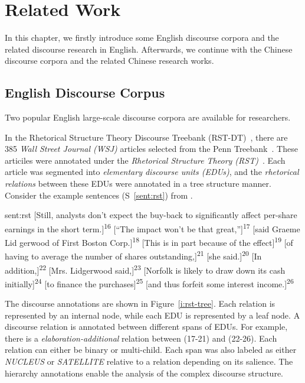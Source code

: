%
%
%
\chapter{Related Work}
\label{c:related}

In this chapter, we firstly introduce some English discourse corpora and the
related discourse research in English. Afterwards, we continue with the Chinese
discourse corpora and the related Chinese research works.

\section{English Discourse Corpus}

Two popular English large-scale discourse corpora are available for researchers.

In the Rhetorical Structure Theory Discourse Treebank (RST-DT)~\citep{Carlson01building},
there are 385 \textit{Wall Street Journal (WSJ)} articles selected from
the Penn Treebank~\citep{marcus1993building}. These articiles were annotated under
the \textit{Rhetorical Structure Theory (RST)}~\citep{mann-thompson88}.
Each article was segmented into \textit{elementary discourse units (EDUs)}, and the
\textit{rhetorical relations} between these EDUs were annotated in a tree structure
manner.
Consider the example sentences (S~\ref{sent:rst})  from \cite{Carlson01building}.

\begin{sent}{sent:rst}{}
[Still, analysts don't expect the buy-back to significantly affect per-share earnings in the short
term.]\textsuperscript{16} [``The impact won't be that great,'']\textsuperscript{17}
[said Graeme Lid gerwood of First Boston Corp.]\textsuperscript{18}
[This is in part because of the effect]\textsuperscript{19}
[of having to average the number of shares outstanding,]\textsuperscript{21}
[she said.]\textsuperscript{20} [In addition,]\textsuperscript{22}
[Mrs. Lidgerwood said,]\textsuperscript{23}
[Norfolk is likely to draw down its cash initially]\textsuperscript{24}
[to finance the purchases]\textsuperscript{25}
[and thus forfeit some interest income.]\textsuperscript{26}
\end{sent}

The discourse annotations are shown in Figure~\ref{i:rst-tree}. Each relation is represented
by an internal node, while each EDU is represented by a leaf node. A discourse relation is
annotated between different spans of EDUs. For example, there is a \textit{elaboration-additional}
relation between (17-21) and (22-26). Each relation can either be binary or multi-child.
Each span was also labeled as either \textit{NUCLEUS} or \textit{SATELLITE} relative
to a relation depending on its salience. The hierarchy annotations enable the analysis of
the complex discourse structure.

